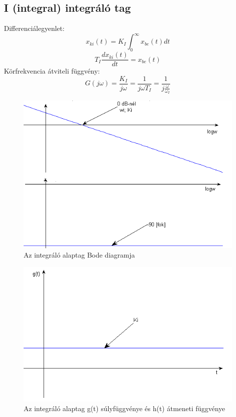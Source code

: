 \documentclass[11pt,a4paper]{article}
\begin{document}
\subsection{I (integral) integráló tag}
Differenciálegyenlet:$$x_{ki}\left(t\right) = K_I \int_0^\infty x_{be}\left(t\right)dt$$
$$T_I\frac{dx_{ki}\left(t\right)}{dt} = x_{be}\left(t\right)$$
Körfrekvencia átviteli függvény:$$G\left(j\omega\right) = \frac{K_I}{j\omega} = \frac{1}{j\omega T_I} = \frac{1}{j\frac{\omega}{\omega_I}}$$
\begin{figure}[hbtp]
    	 \centering
		\includegraphics[scale=1.0]{27_i_tag_bode.png}
		\caption{Az integráló alaptag Bode diagramja}
\end{figure}
\begin{figure}[hbtp]
    	 \centering
		\includegraphics[scale=1.0]{28_i_tag_atmenet.png}
		\caption{Az integráló alaptag g(t) súlyfüggvénye és h(t) átmeneti függvénye}
\end{figure}
\newpage
\end{document}
